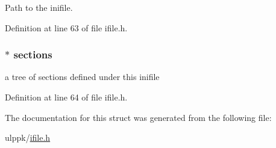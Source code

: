 Path to the inifile. 



Definition at line 63 of file ifile.\-h.

\hypertarget{struct_i_f___i_n_i_f_i_l_e_a01635bfe6be6a3bc8200031a3ab1d33d}{
\subsubsection[{sections}]{$\ast$ sections}}\label{struct_i_f___i_n_i_f_i_l_e_a01635bfe6be6a3bc8200031a3ab1d33d}


a tree of sections defined under this inifile 



Definition at line 64 of file ifile.\-h.



The documentation for this struct was generated from the following file\-:\begin{DoxyCompactItemize}
\item 
ulppk/\hyperlink{ifile_8h}{ifile.\-h}\end{DoxyCompactItemize}

